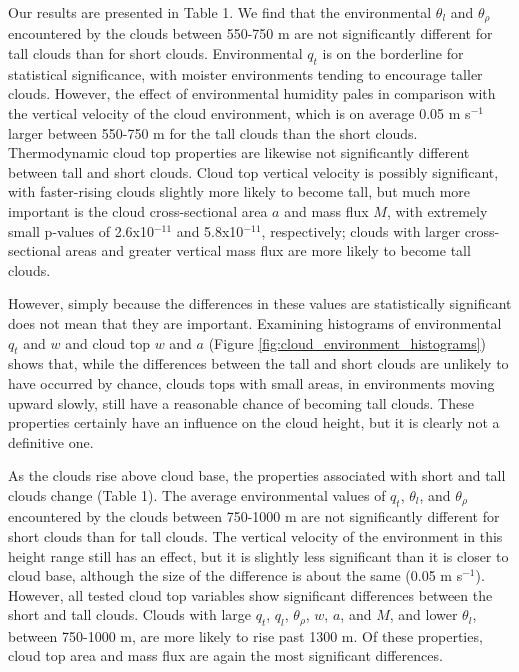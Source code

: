 \documentclass[acp]{copernicus}
\begin{document}
Our results are presented in Table 1.  We find that the environmental 
$\theta_l$ and $\theta_\rho$ encountered by the clouds between 550-750 m are 
not significantly different for tall clouds than for short clouds.  
Environmental $q_t$ is on the borderline for statistical significance, with 
moister environments tending to encourage taller clouds.  However, the effect 
of environmental humidity pales in comparison with the vertical velocity of the 
cloud environment, which is on average 0.05 m s$^{-1}$ larger between 550-750 m 
for the tall clouds than the short clouds.  Thermodynamic cloud top properties 
are likewise not significantly different between tall and short clouds.  Cloud 
top vertical velocity is possibly significant, with faster-rising clouds 
slightly more likely to become tall, but much more important is the cloud 
cross-sectional area $a$ and mass flux $M$, with extremely small p-values of 
2.6x10$^{-11}$ and 5.8x10$^{-11}$, respectively; clouds with larger 
cross-sectional areas and greater vertical mass flux are more likely to become 
tall clouds.

However, simply because the differences in these values are statistically 
significant does not mean that they are important.  Examining histograms of 
environmental $q_t$ and $w$ and cloud top $w$ and $a$ (Figure 
\ref{fig:cloud_environment_histograms}) shows that, while the differences 
between the tall and short clouds are unlikely to have occurred by chance, 
clouds tops with small areas, in environments moving upward slowly, still have 
a reasonable chance of becoming tall clouds.  These properties certainly have 
an influence on the cloud height, but it is clearly not a definitive one.

As the clouds rise above cloud base, the properties associated with short and 
tall clouds change (Table 1).  The average environmental 
values of $q_t$, $\theta_l$, and $\theta_\rho$ encountered by the clouds 
between 750-1000 m are not significantly different for short clouds than for 
tall clouds.  The vertical velocity of the environment in this height range 
still has an effect, but it is slightly less significant than it is closer to 
cloud base, although the size of the difference is about the same 
(0.05 m s$^{-1}$).  However, all tested cloud top variables show significant 
differences between the short and tall clouds.  Clouds with large $q_t$, $q_l$, 
$\theta_\rho$, $w$, $a$, and $M$, and lower $\theta_l$, between 750-1000 m, 
are more likely to rise past 1300 m.  Of these properties, cloud top area and 
mass flux are again the most significant differences.
\end{document}
